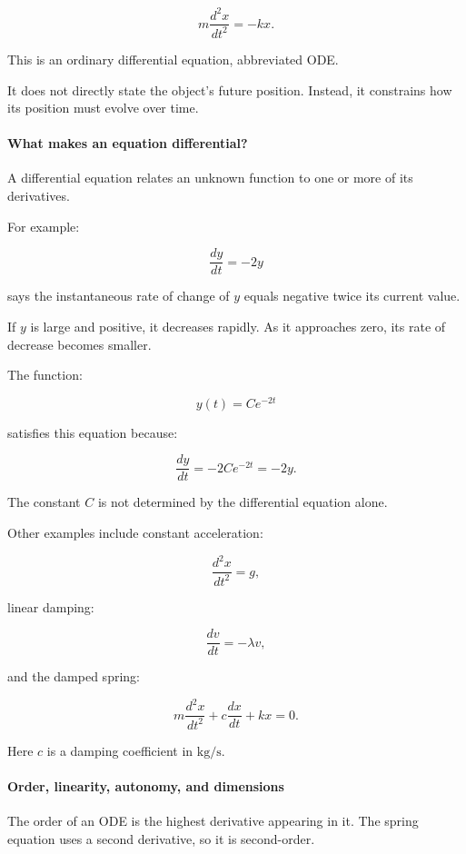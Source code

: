 \[
\boxed{m\frac{d^2x}{dt^2}=-kx}.
\]

This is an ordinary differential equation, abbreviated ODE.

It does not directly state the object's future position. Instead, it constrains how its position must evolve over time.

\paragraph{What makes an equation differential?}\label{02-foundations-ii-ch022-what-makes-an-equation-differential}

A differential equation relates an unknown function to one or more of its derivatives.

For example:

\[
\frac{dy}{dt}=-2y
\]

says the instantaneous rate of change of \(y\) equals negative twice its current value.

If \(y\) is large and positive, it decreases rapidly. As it approaches zero, its rate of decrease becomes smaller.

The function:

\[
y(t)=Ce^{-2t}
\]

satisfies this equation because:

\[
\frac{dy}{dt}=-2Ce^{-2t}=-2y.
\]

The constant \(C\) is not determined by the differential equation alone.

Other examples include constant acceleration:

\[
\frac{d^2x}{dt^2}=g,
\]

linear damping:

\[
\frac{dv}{dt}=-\lambda v,
\]

and the damped spring:

\[
m\frac{d^2x}{dt^2}+c\frac{dx}{dt}+kx=0.
\]

Here \(c\) is a damping coefficient in \(\mathrm{kg/s}\).

\paragraph{Order, linearity, autonomy, and dimensions}\label{02-foundations-ii-ch022-order-linearity-autonomy-and-dimensions}

The order of an ODE is the highest derivative appearing in it. The spring equation uses a second derivative, so it is second-order.

